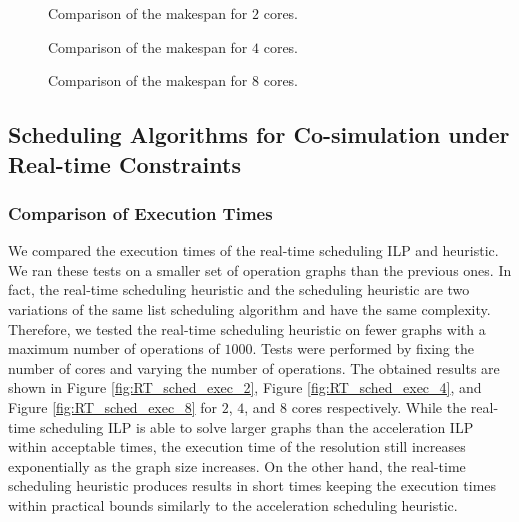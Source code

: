 \begin{figure}[phbt]
\centering

\caption{Comparison of the makespan for $2$ cores.}
\label{fig:sched_mkspan_2}
\end{figure}

\begin{figure}[phbt]
\centering

\caption{Comparison of the makespan for $4$ cores.}
\label{fig:sched_mkspan_4}
\end{figure}

\begin{figure}[phbt]
\centering

\caption{Comparison of the makespan for $8$ cores.}
\label{fig:sched_mkspan_8}
\end{figure} 

%

\subsection{Scheduling Algorithms for Co-simulation under Real-time Constraints}

\subsubsection{Comparison of Execution Times}

We compared the execution times of the real-time scheduling ILP and heuristic. We ran these tests on a smaller set of operation graphs than the previous ones. In fact, the real-time scheduling heuristic and the scheduling heuristic are two variations of the same list scheduling algorithm and have the same complexity. Therefore, we tested the real-time scheduling heuristic on fewer graphs with a maximum number of operations of $1000$. Tests were performed by fixing the number of cores and varying the number of operations. The obtained results are shown in Figure \ref{fig:RT_sched_exec_2}, Figure \ref{fig:RT_sched_exec_4}, and Figure \ref{fig:RT_sched_exec_8} for $2$, $4$, and $8$ cores respectively. While the real-time scheduling ILP is able to solve larger graphs than the acceleration ILP within acceptable times, the execution time of the resolution still increases exponentially as the graph size increases. On the other hand, the real-time scheduling heuristic produces results in short times keeping the execution times within practical bounds similarly to the acceleration scheduling heuristic.   

